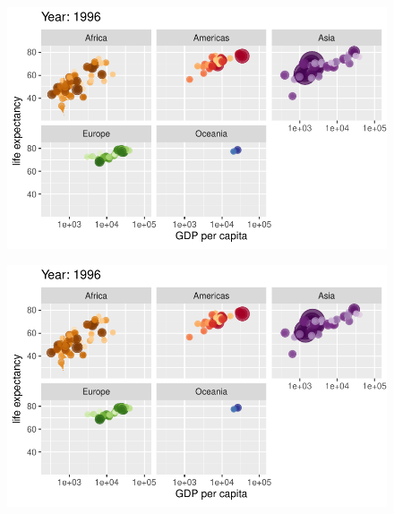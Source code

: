 \documentclass[
  letterpaper,
  DIV=11,
  numbers=noendperiod]{scrartcl}
\begin{document}
\begin{figure}[H]

{\centering \includegraphics{class05_files/figure-pdf/unnamed-chunk-24-80.pdf}

}

\end{figure}

\begin{figure}[H]

{\centering \includegraphics{class05_files/figure-pdf/unnamed-chunk-24-81.pdf}

}

\end{figure}
\end{document}
